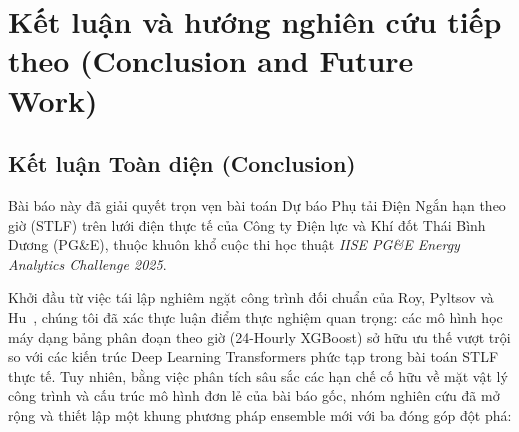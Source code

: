 \section{Kết luận và hướng nghiên cứu tiếp theo (Conclusion and Future Work)}
\label{sec:conclusion}

\subsection{Kết luận Toàn diện (Conclusion)}
Bài báo này đã giải quyết trọn vẹn bài toán Dự báo Phụ tải Điện Ngắn hạn theo giờ (STLF) trên lưới điện thực tế của Công ty Điện lực và Khí đốt Thái Bình Dương (PG\&E), thuộc khuôn khổ cuộc thi học thuật \textit{IISE PG\&E Energy Analytics Challenge 2025}.

Khởi đầu từ việc tái lập nghiêm ngặt công trình đối chuẩn của Roy, Pyltsov và Hu~\cite{roy2025hourly}, chúng tôi đã xác thực luận điểm thực nghiệm quan trọng: các mô hình học máy dạng bảng phân đoạn theo giờ (24-Hourly XGBoost) sở hữu ưu thế vượt trội so với các kiến trúc Deep Learning Transformers phức tạp trong bài toán STLF thực tế. Tuy nhiên, bằng việc phân tích sâu sắc các hạn chế cố hữu về mặt vật lý công trình và cấu trúc mô hình đơn lẻ của bài báo gốc, nhóm nghiên cứu đã mở rộng và thiết lập một khung phương pháp ensemble mới với ba đóng góp đột phá:
